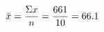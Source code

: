 \documentclass[preview]{standalone}
\begin{document}
\begin{align*}
\special{dvisvgm:raw <g id='unique000'>}\bar{x} = \frac{\Sigma x}{n} = \frac{661}{10} = 66.1\special{dvisvgm:raw </g>}
\end{align*}
\end{document}
